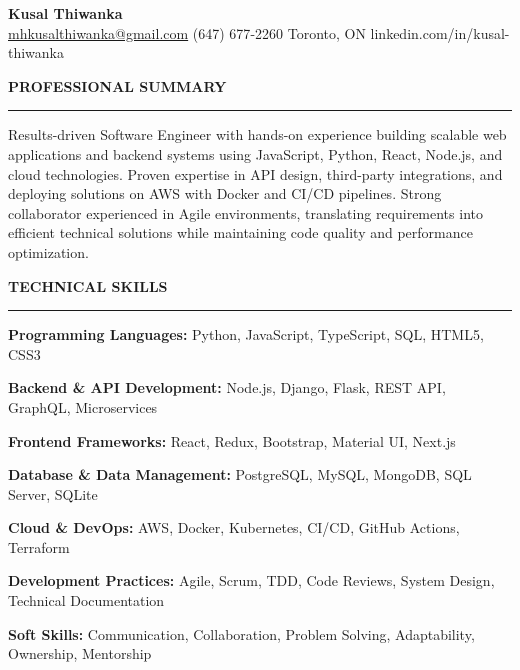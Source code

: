 \documentclass[10pt,letterpaper]{article}
\begin{document}
\begin{center}
{\LARGE\textbf{Kusal Thiwanka}}\\[3pt]
\href{mailto:mhkusalthiwanka@gmail.com}{mhkusalthiwanka@gmail.com}\hspace{2em}%
(647) 677{-}2260\hspace{2em}%
Toronto, ON\hspace{2em}
linkedin.com/in/kusal-thiwanka
\end{center}

\vspace{6pt}

\textbf{PROFESSIONAL SUMMARY}\\[-8pt]
\noindent\rule{\textwidth}{1pt}

\vspace{-2pt}

Results-driven Software Engineer with hands-on experience building scalable web applications and backend systems using JavaScript, Python, React, Node.js, and cloud technologies. Proven expertise in API design, third-party integrations, and deploying solutions on AWS with Docker and CI/CD pipelines. Strong collaborator experienced in Agile environments, translating requirements into efficient technical solutions while maintaining code quality and performance optimization.

\vspace{8pt}

\textbf{TECHNICAL SKILLS}\\[-8pt]
\noindent\rule{\textwidth}{1pt}

\vspace{-2pt}

\textbf{Programming Languages:} Python, JavaScript, TypeScript, SQL, HTML5, CSS3

\textbf{Backend \& API Development:} Node.js, Django, Flask, REST API, GraphQL, Microservices

\textbf{Frontend Frameworks:} React, Redux, Bootstrap, Material UI, Next.js

\textbf{Database \& Data Management:} PostgreSQL, MySQL, MongoDB, SQL Server, SQLite

\textbf{Cloud \& DevOps:} AWS, Docker, Kubernetes, CI/CD, GitHub Actions, Terraform

\textbf{Development Practices:} Agile, Scrum, TDD, Code Reviews, System Design, Technical Documentation

\textbf{Soft Skills:} Communication, Collaboration, Problem Solving, Adaptability, Ownership, Mentorship
\end{document}
